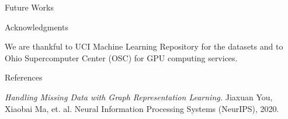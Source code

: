 \documentclass[final]{beamer}
\newlength{\sepwidth}
\newlength{\colwidth}
\newlength{\twocolwidth}
\newcommand{\separatorcolumn}{\begin{column}{\sepwidth}\end{column}}
\begin{document}
\begin{frame}[t]
\begin{columns}[t]
\begin{column}{\twocolwidth}
\begin{columns}[t, totalwidth=\twocolwidth]
\begin{column}{\colwidth}
\begin{block}{Future Works}
\end{block}
\vspace{-.5cm}
\begin{block}{Acknowledgments}
\begin{scriptsize}
We are thankful to UCI Machine Learning Repository for the datasets and to Ohio Supercomputer Center (OSC) for GPU computing services.
\end{scriptsize}
\end{block}
\vspace{-.5cm}
\begin{block}{References}
\begin{scriptsize}
\textit{Handling Missing Data with Graph Representation Learning.} Jiaxuan You, Xiaobai Ma, et. al. Neural Information Processing Systems (NeurIPS), 2020.
\end{scriptsize}
\end{block}


\end{column} %
\end{columns}
\end{column} %

\separatorcolumn
\end{columns}
\end{frame}
\end{document}
